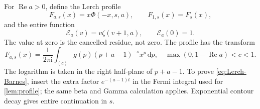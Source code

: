 \documentclass[11pt]{article}
\numberwithin{equation}{section}
\theoremstyle{definition}
\DeclareMathOperator{\Rea}{Re}
\newcommand{\dd}{\,\mathrm d}
\newcommand{\ii}{\mathrm i}
\newcommand{\EE}{\mathcal E}
\begin{document}
For $\Rea a>0$, define the Lerch profile
\begin{equation}\label{eq:Lerch-profile}
 F_{a,s}(x)=x\Phi(-x,s,a),\qquad F_{1,s}(x)=F_s(x),
\end{equation}
and the entire function
\begin{equation}\label{eq:E}
 \EE_a(v)=v\zeta(v+1,a),\qquad \EE_a(0)=1.
\end{equation}
The value at zero is the cancelled residue, not zero. The profile has the transform
\begin{equation}\label{eq:Lerch-Barnes}
 F_{a,s}(x)=\frac1{2\pi\ii}\int_{(c)}g(p)(p+a-1)^{-s}x^p\dd p,
 \quad \max(0,1-\Rea a)<c<1.
\end{equation}
The logarithm is taken in the right half-plane of $p+a-1$. To prove \eqref{eq:Lerch-Barnes}, insert the extra factor $e^{-(a-1)t}$ in the Fermi integral used for \cref{lem:profile}; the same beta and Gamma calculation applies. Exponential contour decay gives entire continuation in $s$.
\end{document}

